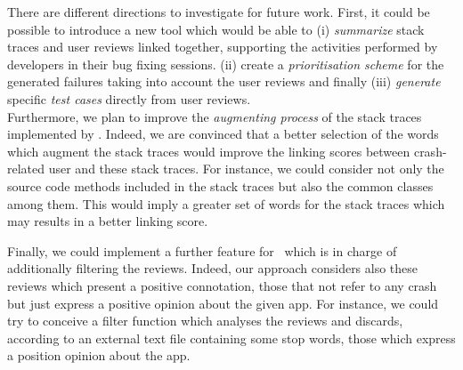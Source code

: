 There are different directions to investigate for future work. 
First, it could be possible to introduce a new tool which would be able to (i) \textit{summarize} stack
traces and user reviews linked together, supporting the activities performed by developers in their bug fixing sessions. 
(ii) create a \textit{prioritisation scheme} for the generated failures taking into account the user reviews and finally (iii) \textit{generate} specific \textit{test cases} directly from user reviews. \\
Furthermore, we plan to improve the \textit{augmenting process} of the stack traces implemented by \toolname. 
Indeed, we are convinced that a better selection of the words which augment the stack traces would improve the linking scores between crash-related user and these stack traces. 
For instance, we could consider not only the source code methods included in the stack traces but also the common classes among them. 
This would imply a greater set of words for the stack traces which may results in a better linking score. 


Finally, we could implement a further feature for \toolname\, which is in charge of additionally  filtering the reviews. 
Indeed, our approach considers also these reviews which present a positive connotation, \ie those that not refer to any crash but just express a positive opinion about the given app. 
For instance, we could try to conceive a filter function which analyses the reviews and discards, according to an external text file containing some stop words, those which express a position opinion about the app. 






 